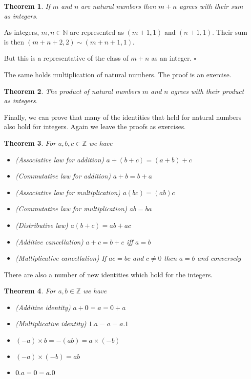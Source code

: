 \documentclass[10pt]{article}
\newcommand{\Z}{\mathbb{Z}}
\newcommand{\N}{\mathbb{N}}
\newcommand{\qed}{\square}
\newtheorem{theorem}{Theorem}[section]
\newenvironment{proof}[1][Proof]{\begin{trivlist}
\item[\hskip \labelsep {\bfseries #1}]}{\end{trivlist}}
\begin{document}
\begin{theorem}
If $m$ and $n$ are natural numbers then $m + n$ agrees with their sum as integers.
\end{theorem}

\begin{proof}
As integers, $m, n \in \N$ are represented as $(m + 1, 1)$ and $(n + 1, 1)$. Their sum is then $(m + n + 2, 2) \sim (m + n + 1, 1)$.

But this is a representative of the class of $m + n$ as an integer. $\qed$
\end{proof}

The same holds multiplication of natural numbers. The proof is an exercise.

\begin{theorem}
The product of natural numbers $m$ and $n$ agrees with their product as integers.
\end{theorem}

Finally, we can prove that many of the identities that held for natural numbers also hold for integers. Again we leave the proofs as exercises.

\begin{theorem}
For $a, b, c \in \Z$ we have
\begin{itemize}
\item (Associative law for addition) $a + (b + c) = (a + b) + c$
\item (Commutative law for addition) $a + b = b + a$
\item (Associative law for multiplication) $a(bc) = (ab)c$
\item (Commutative law for multiplication) $ab = ba$
\item (Distributive law) $a(b + c) = ab + ac$
\item (Additive cancellation) $a + c = b + c$ iff $a = b$
\item (Multiplicative cancellation) If $ac = bc$ and $c \neq 0$ then $a = b$ and conversely
\end{itemize}
\end{theorem}

There are also a number of new identities which hold for the integers.

\begin{theorem}
For $a, b \in \Z$ we have
\begin{itemize}
\item (Additive identity) $a + 0 = a = 0 + a$
\item (Multiplicative identity) $1.a = a = a.1$
\item $(-a)\times b = -(ab) = a\times (-b)$
\item $(-a)\times (-b) = ab$
\item $0.a = 0 = a.0$
\end{itemize}
\end{theorem}
\end{document}
